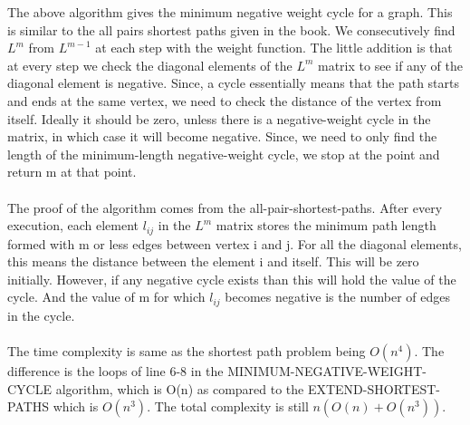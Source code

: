 \documentclass[10pt]{article}
\begin{document}
The above algorithm gives the minimum negative weight cycle for a graph. This is similar to the all pairs shortest paths given in the book. We consecutively find $L^m$ from $L^{m-1}$ at each step with the weight function. The little addition is that at every step we check the diagonal elements of the $L^m$ matrix to see if any of the diagonal element is negative. Since, a cycle essentially means that the path starts and ends at the same vertex, we need to check the distance of the vertex from itself. Ideally it should be zero, unless there is a negative-weight cycle in the matrix, in which case it will become negative. Since, we need to only find the length of the minimum-length negative-weight cycle, we stop at the point and return m at that point.\\\\
The proof of the algorithm comes from the all-pair-shortest-paths. After every execution, each element $l_{ij}$ in the $L^{m}$ matrix stores the minimum path length formed with m or less edges between vertex i and j. For all the diagonal elements, this means the distance between the element i and itself. This will be zero initially. However, if any negative cycle exists than this will hold the value of the cycle. And the value of m for which $l_{ij}$ becomes negative is the number of edges in the cycle.\\\\
The time complexity is same as the shortest path problem being $O(n^4)$. The difference is the loops of line 6-8 in the MINIMUM-NEGATIVE-WEIGHT-CYCLE algorithm, which is O(n) as compared to the EXTEND-SHORTEST-PATHS which is $O(n^3)$. The total complexity is still $n(O(n)+O(n^3))$.
\newpage
\end{document}
